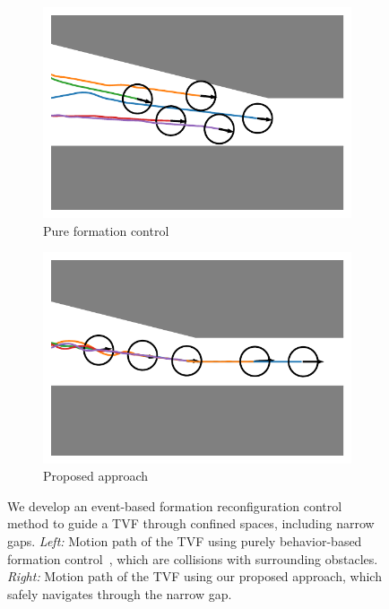 \begin{figure}
\centering
\begin{subfigure}[b]{0.4\textwidth}
    
    \centering
    \includegraphics[width=\linewidth]{paper2/images/sample_bc.pdf}
    \caption{Pure formation control}
    \label{fig:1sample_bc}
\end{subfigure}
\begin{subfigure}[b]{0.4\textwidth}
    \centering
    \includegraphics[width=\linewidth]{paper2/images/sample_edc.pdf}
    \caption{Proposed approach}
    \label{fig:1sample_edc}
\end{subfigure}
\caption{We develop an event-based formation reconfiguration control method to guide a TVF through confined spaces, including narrow gaps. \textit{Left:} Motion path of the TVF using purely behavior-based formation control~\cite{736776, Vsrhelyi2018}, which are collisions with surrounding obstacles. \textit{Right:} Motion path of the TVF using our proposed approach, which safely navigates through the narrow gap.}
\label{fig:1sample}
\end{figure}

